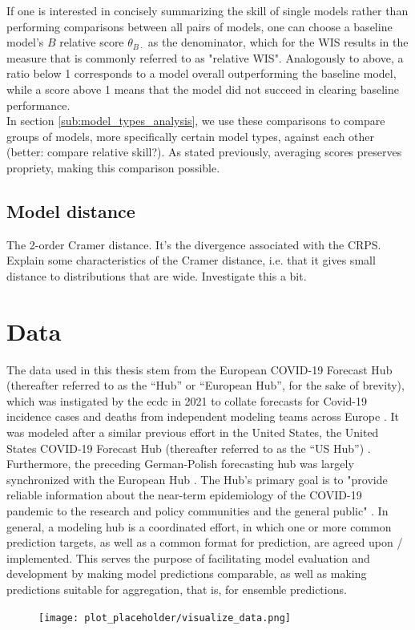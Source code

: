If one is interested in concisely summarizing the skill of single models rather than performing comparisons between all pairs of models, one can choose a baseline model's $B$ relative score $\theta_{B\cdot}$ as the denominator, which for the WIS results in the measure that is commonly referred to as "relative WIS". Analogously to above, a ratio below 1 corresponds to a model overall outperforming the baseline model, while a score above 1 means that the model did not succeed in clearing baseline performance.\\
In section \ref{sub:model_types_analysis}, we use these comparisons to compare groups of models, more specifically certain model types, against each other (better: compare relative skill?). As stated previously, averaging scores preserves propriety, making this comparison possible.
\subsection{Model distance}
The 2-order Cramer distance.
It's the divergence associated with the CRPS.\\
Explain some characteristics of the Cramer distance, i.e. that it gives small distance to distributions that are wide. Investigate this a bit.
\section{Data}
The data used in this thesis stem from the European COVID-19 Forecast Hub (thereafter referred to as the ``Hub'' or ``European Hub'', for the sake of brevity), which was instigated by the \ac{ecdc} in 2021 to collate forecasts for Covid-19 incidence cases and deaths from independent modeling teams across Europe \citep{european_covid-19_forecast_hub_european_2021}. It was modeled after a similar previous effort in the United States, the United States COVID-19 Forecast Hub (thereafter referred to as the ``US Hub'') \citep{cramer_united_2021}. Furthermore, the preceding German-Polish forecasting hub was largely synchronized with the European Hub \citep{bracher_german_2020}. The Hub's primary goal is to "provide reliable information about the near-term epidemiology of the COVID-19 pandemic to the research and policy communities and the general public" \citep{sherratt_predictive_2022}. In general, a modeling hub is a coordinated effort, in which one or more common prediction targets, as well as a common format for prediction, are agreed upon / implemented. This serves the purpose of facilitating model evaluation and development by making model predictions comparable, as well as making predictions suitable for aggregation, that is, for ensemble predictions. \\
\begin{figure}
\texttt{[image: plot\_placeholder/visualize\_data.png]}
\end{figure}

